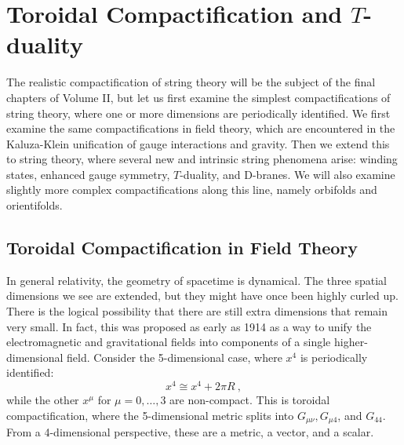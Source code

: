 
\chapter{\texorpdfstring{Toroidal Compactification and $T$-duality}{8 Toroidal Compactification and $T$-duality}} \label{cha:8}
The realistic compactification of string theory will be the subject of the final chapters of Volume II, but let us first examine the simplest compactifications of string theory, where one or more dimensions are periodically identified. 
We first examine the same compactifications in field theory, which are encountered in the Kaluza-Klein unification of gauge interactions and gravity.
Then we extend this to string theory, where several new and intrinsic string phenomena arise: 
winding states, enhanced gauge symmetry, $T$-duality, and D-branes. We will also examine slightly more complex compactifications along this line, namely orbifolds and orientifolds.

\section{\texorpdfstring{Toroidal Compactification in Field Theory}{8.1 Toroidal Compactification in Field Theory}} \label{sec:8.1}

In general relativity, the geometry of spacetime is dynamical. The three spatial dimensions we see are extended, but they might have once been highly curled up. There is the logical possibility that there are still extra dimensions that remain very small.
In fact, this was proposed as early as 1914 as a way to unify the electromagnetic and gravitational fields into components of a single higher-dimensional field. Consider the 5-dimensional case, where $x^{4}$ is periodically identified:
\begin{equation}
	x^{4} \cong x^{4}+2 \pi R \:, \label{8.1.1}
\end{equation}
while the other $x^{\mu}$ for $\mu=0,\ldots,3$ are non-compact.
This is toroidal compactification, where the 5-dimensional metric splits into $G_{\mu \nu}, G_{\mu 4}$, and $G_{44} $. From a 4-dimensional perspective, these are a metric, a vector, and a scalar.

